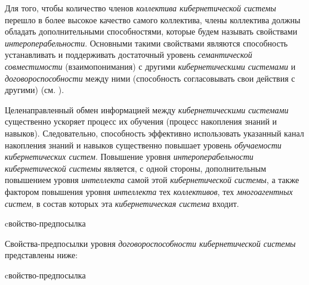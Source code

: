Для того, чтобы количество членов \textit{коллектива кибернетической системы} перешло в более высокое качество самого коллектива, члены коллектива должны обладать дополнительными способностями, которые будем называть свойствами \textit{интероперабельности}.
Основными такими свойствами являются способность устанавливать и поддерживать достаточный уровень \textit{семантической совместимости} (взаимопонимания) с другими \textit{кибернетическими системами} и \textit{договороспособности} между ними (способность согласовывать свои действия с другими) (см. ).

Целенаправленный обмен информацией между \textit{кибернетическими системами} существенно ускоряет процесс их обучения (процесс накопления знаний и навыков). Следовательно, способность эффективно использовать указанный канал накопления знаний и навыков существенно повышает уровень \textit{обучаемости кибернетических систем}. Повышение уровня \textit{интероперабельности кибернетической системы} является, с одной стороны, дополнительным повышением уровня \textit{интеллекта} самой этой \textit{кибернетической системы}, а также фактором повышения уровня \textit{интеллекта} тех \textit{коллективов}, тех \textit{многоагентных систем}, в состав которых эта \textit{кибернетическая система} входит.

\begin{SCn}
\begin{scnrelfromlist}{cвойство-предпосылка}
\end{scnrelfromlist}
\end{SCn}

Свойства-предпосылки уровня \textit{договороспособности кибернетической системы} представлены ниже:

\begin{SCn}
\begin{scnrelfromlist}{cвойство-предпосылка}
\end{scnrelfromlist}
\end{SCn}

